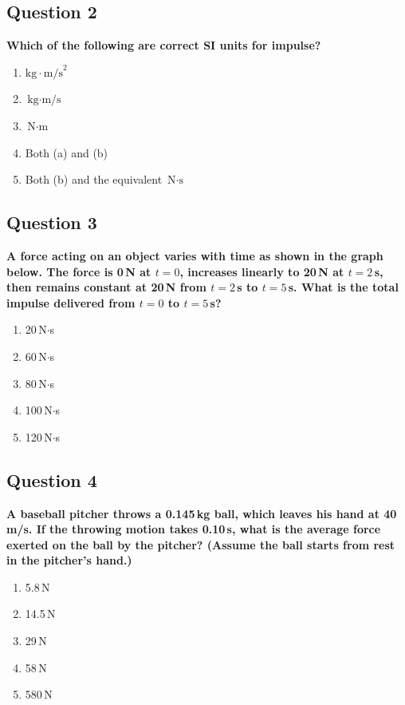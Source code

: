 \documentclass[12pt,letterpaper]{article}
\begin{document}
\subsection{Question 2}

\begin{questionbox}
\textbf{Which of the following are correct SI units for impulse?}

\begin{enumerate}[label=\alph*)]
    \item $\text{kg}\cdot\text{m/s}^2$
    \item $\text{kg}\cdot\text{m/s}$
    \item $\text{N}\cdot\text{m}$
    \item Both (a) and (b)
    \item Both (b) and the equivalent $\text{N}\cdot\text{s}$
\end{enumerate}
\end{questionbox}

\subsection{Question 3}

\begin{questionbox}
\textbf{A force acting on an object varies with time as shown in the graph below. The force is 0\,N at $t=0$, increases linearly to 20\,N at $t=2$\,s, then remains constant at 20\,N from $t=2$\,s to $t=5$\,s. What is the total impulse delivered from $t=0$ to $t=5$\,s?}

\begin{enumerate}[label=\alph*)]
    \item 20\,N$\cdot$s
    \item 60\,N$\cdot$s
    \item 80\,N$\cdot$s
    \item 100\,N$\cdot$s
    \item 120\,N$\cdot$s
\end{enumerate}
\end{questionbox}

\subsection{Question 4}

\begin{questionbox}
\textbf{A baseball pitcher throws a 0.145\,kg ball, which leaves his hand at 40\,m/s. If the throwing motion takes 0.10\,s, what is the average force exerted on the ball by the pitcher? (Assume the ball starts from rest in the pitcher's hand.)}

\begin{enumerate}[label=\alph*)]
    \item 5.8\,N
    \item 14.5\,N
    \item 29\,N
    \item 58\,N
    \item 580\,N
\end{enumerate}
\end{questionbox}
\end{document}
